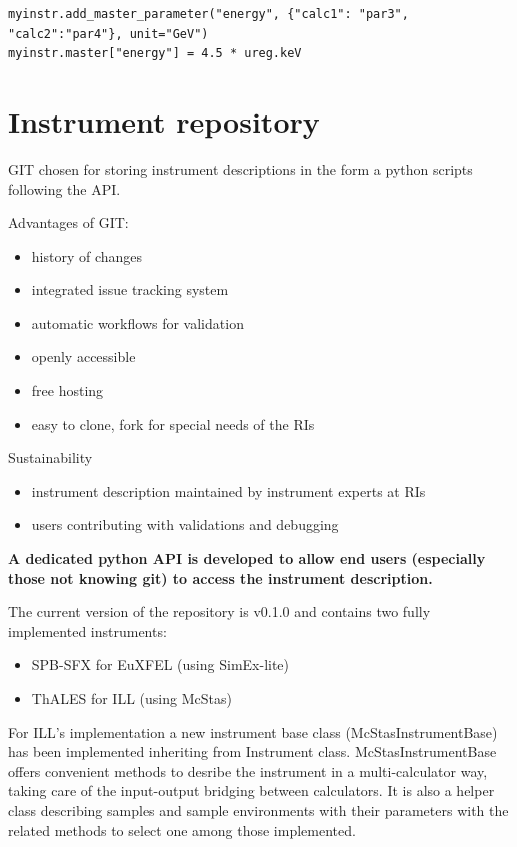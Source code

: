 \documentclass[11pt, a4paper]{article}
\begin{document}
  \begin{lstlisting}
myinstr.add_master_parameter("energy", {"calc1": "par3", "calc2":"par4"}, unit="GeV")
myinstr.master["energy"] = 4.5 * ureg.keV
\end{lstlisting}

\section{Instrument repository}

  GIT chosen for storing instrument descriptions in the form a python scripts following
  the \libpyvinyl API.

  Advantages of GIT:
  \begin{itemize}
  \item history of changes
  \item integrated issue tracking system
  \item automatic workflows for validation
  \item openly accessible
  \item free hosting
  \item easy to clone, fork for special needs of the RIs
  \end{itemize}

   {Sustainability}
    \begin{itemize}
    \item instrument description maintained by instrument experts at RIs
    \item users contributing with validations and debugging %
    \end{itemize}
 
  {\bfseries A dedicated python API is developed to allow end users (especially those not knowing git) to access the instrument description.}

The current version of the repository is v0.1.0 and contains two fully implemented instruments:
\begin{itemize}
 \item SPB-SFX for EuXFEL (using SimEx-lite)
\item ThALES for ILL (using McStas)
\end{itemize}

For ILL's implementation a new instrument base class (McStasInstrumentBase) has been implemented inheriting from \libpyvinyl Instrument class. McStasInstrumentBase offers convenient methods to desribe the instrument in a multi-calculator way, taking care of the input-output bridging between calculators. It is also a helper class describing samples and sample environments with their parameters with the related methods to select one among those implemented.
\end{document}
